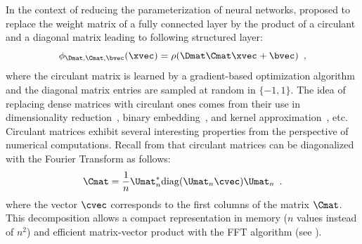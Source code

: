 


In the context of reducing the parameterization of neural networks, \citet{cheng2015exploration} proposed to replace the weight matrix of a fully connected layer by the product of a circulant and a diagonal matrix leading to following structured layer:
\begin{equation}
  \layer_{\Dmat, \Cmat, \bvec} (\xvec) = \act \left( \Dmat \Cmat \xvec + \bvec \right) \enspace,
\end{equation}
where the circulant matrix is learned by a gradient-based optimization algorithm and the diagonal matrix entries are sampled at random in $\{-1, 1\}$. 
The idea of replacing dense matrices with circulant ones comes from their use in dimensionality reduction~\cite{hinrichs2011johnson,vybiral2011variant}, binary embedding~\cite{yu2014circulant}, and kernel approximation~\cite{yu2015compact}, etc.
Circulant matrices exhibit several interesting properties from the perspective of numerical computations.
Recall from  that circulant matrices can be diagonalized with the Fourier Transform as follows:
\begin{equation}
  \Cmat = \frac{1}{n} \Umat_n^* \diag(\Umat_n \cvec) \Umat_n \enspace.
\end{equation}
where the vector $\cvec$ corresponds to the first columns of the matrix $\Cmat$.
This decomposition allows a compact representation in memory ($n$ values instead of $n^2$) and efficient matrix-vector product with the FFT algorithm (see ).
